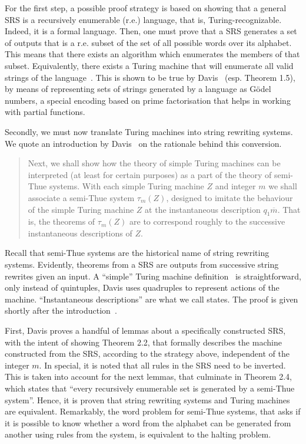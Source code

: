 \documentclass[12pt]{article}
\begin{document}
For the first step, a possible proof strategy is based on showing that a
general SRS is a recursively enumerable (r.e.) language, that is,
Turing-recognizable. Indeed, it is a formal language. Then, one must prove that
a SRS generates a set of outputs that is a r.e. subset of the set of all
possible words over its alphabet. This means that there exists an algorithm
which enumerates the members of that subset. Equivalently, there exists a
Turing machine that will enumerate all valid strings of the
language~\cite[Theorem 3.21]{Sipser:book:2012}. This is shown to be true by
Davis~\cite[pp. 84--86]{Davis:book:1958} (esp. Theorem 1.5), by means of
representing sets of strings generated by a language as Gödel numbers, a
special encoding based on prime factorisation that helps in working with
partial functions.

Secondly, we must now translate Turing machines into string rewriting systems.
We quote an introduction by Davis~\cite[Sec. 6.2]{Davis:book:1958} on the
rationale behind this conversion.

\begin{quote}
    Next, we shall show how the theory of simple Turing machines can be
    interpreted (at least for certain purposes) as a part of the theory of
    semi-Thue systems. With each simple Turing machine $Z$ and integer $m$ we
    shall associate a semi-Thue system $\tau_{m}(Z)$, designed to imitate the
    behaviour of the simple Turing machine $Z$ at the instantaneous description
    $q_{1}\overline{m}$. That is, the theorems of $\tau_{m}(Z)$ are to
    correspond roughly to the successive instantaneous descriptions of $Z$.
\end{quote}

Recall that semi-Thue systems are the historical name of string rewriting
systems. Evidently, theorems from a SRS are outputs from successive string
rewrites given an input. A ``simple'' Turing machine definition~\cite[Sec. 1.1,
Def. 1.3]{Davis:book:1958} is straightforward, only instead of quintuples,
Davis uses quadruples to represent actions of the machine. ``Instantaneous
descriptions'' are what we call states. The proof is given shortly after the
introduction~\cite[pp. 88--93]{Davis:book:1958}.

First, Davis proves a handful of lemmas about a specifically constructed SRS,
with the intent of showing Theorem 2.2, that formally describes the machine
constructed from the SRS, according to the strategy above, independent of the
integer $m$. In special, it is noted that all rules in the SRS need to be
inverted. This is taken into account for the next lemmas, that culminate in
Theorem 2.4, which states that ``every recursively enumerable set is generated
by a semi-Thue system''. Hence, it is proven that string rewriting systems and
Turing machines are equivalent. Remarkably, the word problem for semi-Thue
systems, that asks if it is possible to know whether a word from the alphabet
can be generated from another using rules from the system, is equivalent to the
halting problem.
\end{document}
